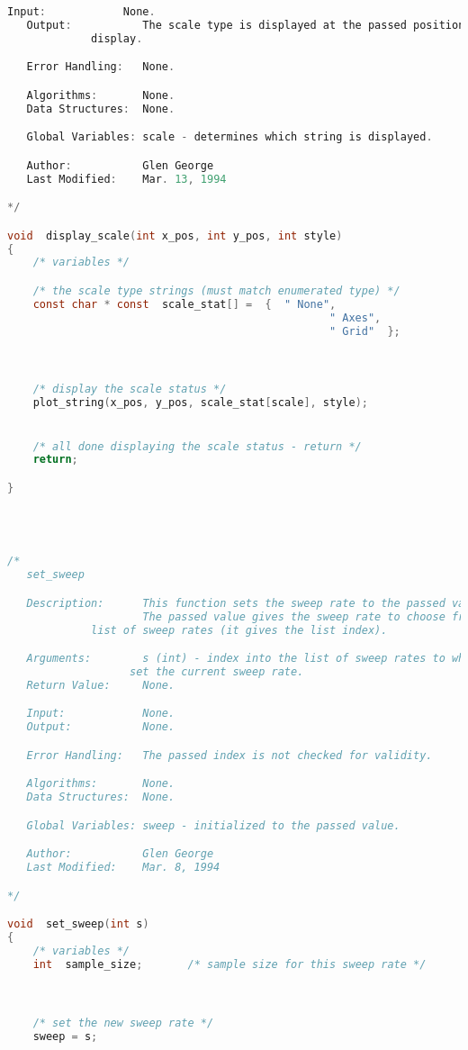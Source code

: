 \begin{lstlisting}[language=C]
   Input:            None.
   Output:           The scale type is displayed at the passed position on the
   		     display.

   Error Handling:   None.

   Algorithms:       None.
   Data Structures:  None.

   Global Variables: scale - determines which string is displayed.

   Author:           Glen George
   Last Modified:    Mar. 13, 1994

*/

void  display_scale(int x_pos, int y_pos, int style)
{
    /* variables */

    /* the scale type strings (must match enumerated type) */
    const char * const  scale_stat[] =  {  " None",
                                                  " Axes",
                                                  " Grid"  };



    /* display the scale status */
    plot_string(x_pos, y_pos, scale_stat[scale], style);


    /* all done displaying the scale status - return */
    return;

}




/*
   set_sweep

   Description:      This function sets the sweep rate to the passed value.
                     The passed value gives the sweep rate to choose from the
		     list of sweep rates (it gives the list index).

   Arguments:        s (int) - index into the list of sweep rates to which to
   			       set the current sweep rate.
   Return Value:     None.

   Input:            None.
   Output:           None.

   Error Handling:   The passed index is not checked for validity.

   Algorithms:       None.
   Data Structures:  None.

   Global Variables: sweep - initialized to the passed value.

   Author:           Glen George
   Last Modified:    Mar. 8, 1994

*/

void  set_sweep(int s)
{
    /* variables */
    int  sample_size;		/* sample size for this sweep rate */



    /* set the new sweep rate */
    sweep = s;


\end{lstlisting}
